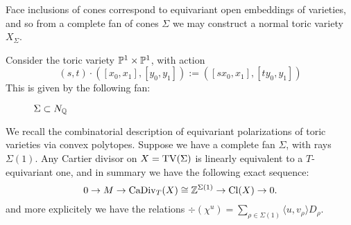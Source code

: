 Face inclusions of cones correspond to equivariant open embeddings of varieties, and so from a complete fan of cones \(\Sigma\) we may construct a normal toric variety \(X_\Sigma\).
\begin{example}
Consider the toric variety \(\mathbb{P}^1 \times \mathbb{P}^1\), with action
\[
(s,t) \cdot ( [x_0,x_1],[y_0,y_1]) := ([sx_0,x_1],[ty_0,y_1])
\]
This is given by the following fan:
\begin{figure}[h]
\centering
	\caption*{$\Sigma \subset N_{\mathbb{Q}}$}
\end{figure}
\end{example}
We recall the combinatorial description of equivariant polarizations of toric varieties via convex polytopes. Suppose we have a complete fan \(\Sigma\), with rays \(\Sigma(1)\). Any Cartier divisor on \(X = \operatorname{TV}(\Sigma)\) is linearly equivalent to a \(T\)-equivariant one, and in summary we have the following exact sequence:
\[
0 \to M \to \operatorname{CaDiv}_T(X) \cong \mathbb{Z}^{\Sigma(1)} \to \operatorname{Cl}(X) \to 0.
\]
and more explicitely we have the relations \(\div(\chi^u) = \sum_{\rho \in \Sigma(1)} \langle u, v_\rho \rangle D_\rho\).

